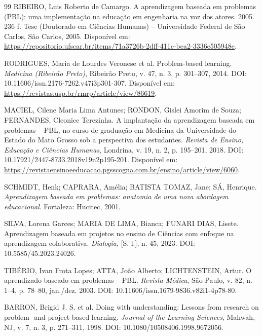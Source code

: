 \begin{thebibliography}{99}
RIBEIRO, Luis Roberto de Camargo. A aprendizagem baseada em problemas (PBL): uma implementação na educação em engenharia na voz dos atores. 2005. 236 f. Tese (Doutorado em Ciências Humanas) -- Universidade Federal de São Carlos, São Carlos, 2005. Disponível em: \url{https://repositorio.ufscar.br/items/71a3726b-2dff-411c-bea2-3336e505948e}.

RODRIGUES, Maria de Lourdes Veronese et al. Problem-based learning. \textit{Medicina (Ribeirão Preto)}, Ribeirão Preto, v. 47, n. 3, p. 301--307, 2014. DOI: 10.11606/issn.2176-7262.v47i3p301-307. Disponível em: \url{https://revistas.usp.br/rmrp/article/view/86619}.

MACIEL, Cilene Maria Lima Antunes; RONDON, Gislei Amorim de Souza; FERNANDES, Cleonice Terezinha. A implantação da aprendizagem baseada em problemas -- PBL, no curso de graduação em Medicina da Universidade do Estado do Mato Grosso sob a perspectiva dos estudantes. \textit{Revista de Ensino, Educação e Ciências Humanas}, Londrina, v. 19, n. 2, p. 195--201, 2018. DOI: 10.17921/2447-8733.2018v19n2p195-201. Disponível em: \url{https://revistaensinoeeducacao.pgsscogna.com.br/ensino/article/view/6060}.

SCHMIDT, Henk; CAPRARA, Amélia; BATISTA TOMAZ, Jane; SÁ, Henrique. \textit{Aprendizagem baseada em problemas: anatomia de uma nova abordagem educacional}. Fortaleza: Hucitec, 2001.

SILVA, Lorena Garces; MARIA DE LIMA, Bianca; FUNARI DIAS, Lisete. Aprendizagem baseada em projetos no ensino de Ciências com enfoque na aprendizagem colaborativa. \textit{Dialogia}, [S. l.], n. 45, 2023. DOI: 10.5585/45.2023.24026.

TIBÉRIO, Ivan Frota Lopes; ATTA, João Alberto; LICHTENSTEIN, Artur. O aprendizado baseado em problemas -- PBL. \textit{Revista Médica}, São Paulo, v. 82, n. 1--4, p. 78--80, jan./dez. 2003. DOI: 10.11606/issn.1679-9836.v82i1-4p78-80.


BARRON, Brigid J. S. et al. Doing with understanding: Lessons from research on problem- and project-based learning. \textit{Journal of the Learning Sciences}, Mahwah, NJ, v. 7, n. 3, p. 271--311, 1998. DOI: 10.1080/10508406.1998.9672056.


\end{thebibliography}
